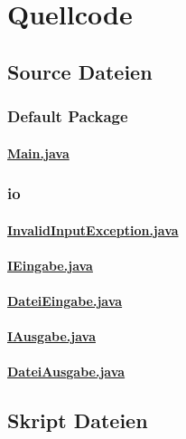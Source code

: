\chapter{Quellcode}
\label{Quellcode}
\section{Source Dateien}
\subsection{Default Package}
\subsubsection{\underline{Main.java}}

\clearpage
%
\subsection{io}
\subsubsection{\underline{InvalidInputException.java}}

\clearpage
%
\subsubsection{\underline{IEingabe.java}}

\clearpage
%
\subsubsection{\underline{DateiEingabe.java}}

\clearpage
%
\subsubsection{\underline{IAusgabe.java}}

\clearpage
%
\subsubsection{\underline{DateiAusgabe.java}}

\clearpage
%
\section{Skript Dateien}


\cleardoublepage
